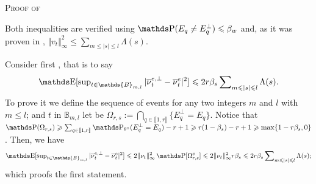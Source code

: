 \begin{pro}{\textsc{Proof of } \\}\label{PRO_FREQ_CIRCDECONV_KNOWN_BETA_ORACLE_NP_BLOCKDIFF}

Both inequalities are verified using $\P(E_{q} \neq E^{\perp}_{q}) \leq \beta_{w}$ and, as it was proven in , $\Vert v_{t} \Vert_{\infty}^{2} \leq \sum\nolimits_{m \leq \vert s \vert \leq l}\Lambda(s)$.

\medskip

Consider first , that is to say
\[ \E[\sup\nolimits_{t \in \mathds{B}_{m, l}} \vert \overline{\nu}^{e, \perp}_{t} - \overline{\nu}^{e}_{t} \vert^{2} ] \leq 2 r \beta_{s} \sum\nolimits_{m \leq \vert s \vert \leq l}\Lambda(s).\]
To prove it we define the sequence of events for any two integers $m$ and $l$ with $m \leq l$; and $t$ in $\mathds{B}_{m, l}$ let be $\Omega_{r, s} := \bigcap\nolimits_{q \in \llbracket 1, r \rrbracket} \{E_{q}^{\perp} = E_{q}\}$.
Notice that $\P(\Omega_{r, s}) \geq \sum\nolimits_{q \in \llbracket 1, r \rrbracket} \P_{\theta^{\circ}}(E_{q}^{\perp} = E_{q}) - r + 1 \geq r (1 - \beta_{s}) - r + 1 \geq \max\{1 - r \beta_{s}, 0 \}$.
Then, we have
\[ \E[\sup\nolimits_{t \in \mathds{B}_{m, l}} \vert \overline{\nu}^{e, \perp}_{t} - \overline{\nu}^{e}_{t} \vert^{2} ] \leq 2 \Vert \nu_{t} \Vert_{\infty}^{2}\P[\Omega_{r, s}^{c} ] \leq 2 \Vert \nu_{t} \Vert_{\infty}^{2} r \beta_{s} \leq 2 r \beta_{s} \sum\nolimits_{m \leq \vert s \vert \leq l}\Lambda(s);\]
which proofs the first statement.
\proEnd
\end{pro}
 
 
